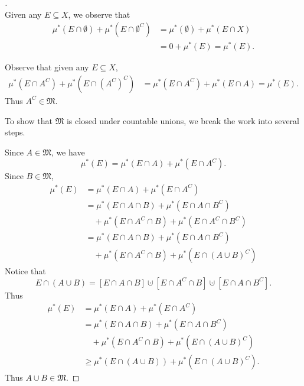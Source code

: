 \documentclass[notoc,notitlepage]{tufte-book}
\begin{document}
\begin{proof}[]\label{proof:caratheodory_s_theorem}
   \\
  Given any $E \subseteq X$, we observe that
  \begin{align*}
    \mu^*(E \cap \emptyset) + \mu^*(E \cap \emptyset^C)
    &= \mu^*(\emptyset) + \mu^*(E \cap X) \\
    &= 0 + \mu^*(E) = \mu^*(E).
  \end{align*}

  Observe that given any $E \subseteq X$,
  \begin{align*}
    \mu^*(E \cap A^C) + \mu^*(E \cap ( A^C )^C)
    &= \mu^*(E \cap A^C) + \mu^*(E \cap A) = \mu^*(E).
  \end{align*}
  Thus $A^C \in \mathfrak{M}$.

  To show that $\mathfrak{M}$ is closed under countable unions,
  we break the work into several steps.

  Since $A \in \mathfrak{M}$, we have
  \begin{equation*}
    \mu^*(E) = \mu^*(E \cap A) + \mu^*(E \cap A^C).
  \end{equation*}
  Since $B \in \mathfrak{M}$,
  \begin{align*}
    \mu^*(E) &= \mu^*(E \cap A) + \mu^*(E \cap A^C) \\
             &= \mu^*(E \cap A \cap B) + \mu^*(E \cap A \cap B^C) \\
             &\quad+ \mu^*(E \cap A^C \cap B) + \mu^*(E \cap A^C \cap B^C) \\
             &= \mu^*(E \cap A \cap B) + \mu^*(E \cap A \cap B^C) \\
             &\quad+ \mu^*(E \cap A^C \cap B) + \mu^*(E \cap (A \cup B)^C)
  \end{align*}
  Notice that
  \begin{equation*}
    E \cap (A \cup B)
    = [E \cap A \cap B] \cupdot [E \cap A^C \cap B] \cupdot [E \cap A \cap B^C].
  \end{equation*}
  Thus
  \begin{align*}
    \mu^*(E) &= \mu^*(E \cap A) + \mu^*(E \cap A^C) \\
             &= \mu^*(E \cap A \cap B) + \mu^*(E \cap A \cap B^C) \\
             &\quad+ \mu^*(E \cap A^C \cap B) + \mu^*(E \cap (A \cup B)^C) \\
             &\geq \mu^*(E \cap (A \cup B)) + \mu^*(E \cap (A \cup B)^C).
  \end{align*}
  Thus $A \cup B \in \mathfrak{M}$.


\end{proof}
\end{document}
